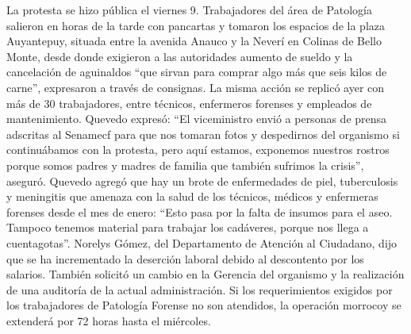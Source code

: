 \documentclass{article}%
\begin{document}
\newline%
%
La protesta se hizo pública el viernes 9. Trabajadores del área de Patología salieron en horas de la tarde con pancartas y tomaron los espacios de la plaza Auyantepuy, situada entre la avenida Anauco y la Neverí en Colinas de Bello Monte, desde donde exigieron a las autoridades aumento de sueldo y la cancelación de aguinaldos “que sirvan para comprar algo más que seis kilos de carne”, expresaron a través de consignas.%
\newline%
%
La misma acción se replicó ayer con más de 30 trabajadores, entre técnicos, enfermeros forenses y empleados de mantenimiento. Quevedo expresó: “El viceministro envió a personas de prensa adscritas al Senamecf para que nos tomaran fotos y despedirnos del organismo si continuábamos con la protesta, pero aquí estamos, exponemos nuestros rostros porque somos padres y madres de familia que también sufrimos la crisis”, aseguró.%
\newline%
%
Quevedo agregó que hay un brote de enfermedades de piel, tuberculosis y meningitis que amenaza con la salud de los técnicos, médicos y enfermeras forenses desde el mes de enero: “Esto pasa por la falta de insumos para el aseo. Tampoco tenemos material para trabajar los cadáveres, porque nos llega a cuentagotas”.%
\newline%
%
Norelys Gómez, del Departamento de Atención al Ciudadano, dijo que se ha incrementado la deserción laboral debido al descontento por los salarios. También solicitó un cambio en la Gerencia del organismo y la realización de una auditoría de la actual administración.%
\newline%
%
Si los requerimientos exigidos por los trabajadores de Patología Forense no son atendidos, la operación morrocoy se extenderá por 72 horas hasta el miércoles.%
\newline%
%
\end{document}
